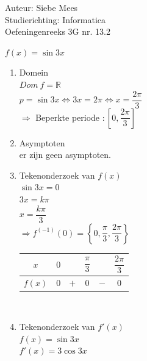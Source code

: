\documentclass[a4paper]{article}
\begin{document}
  
\noindent \large Auteur: Siebe Mees \\
\noindent \large Studierichting: Informatica\\
\noindent \large Oefeningenreeks 3G nr. 13.2\\

\medskip

\normalsize

$f(x)=\sin 3x$\\

\begin{enumerate}

\item Domein\\

$Dom\ f=\mathbb{R}$\\

$p = \sin 3x \Leftrightarrow 3x = 2\pi \Leftrightarrow x = \dfrac{2\pi}{3}$\\

$\Rightarrow $ Beperkte periode $:\left[0,\dfrac{2\pi}{3}\right]$\\


\item Asymptoten\\

er zijn geen asymptoten.\\


\item Tekenonderzoek van $f(x)$\\

$\sin 3x=0$\\

$3x=k\pi $\\

$x=\dfrac{k\pi}{3}$\\

$\Rightarrow f^{(-1)}(0)=\left\{0,\dfrac{\pi}{3},\dfrac{2\pi}{3}\right\}$\\

\begin{tabular}{c|ccccc}
$x$ & $0$ &  & $\dfrac{\pi}{3}$ &  & $\dfrac{2\pi}{3}$ \\ \hline
$f(x)$ & $0$ & $+$ & $0$ & $-$ & $0$
\end{tabular}\\


\item Tekenonderzoek van $f'(x)$\\

$f(x)=\sin 3x$\\

$f'(x)=3\cos 3x$\\


\end{enumerate}
\end{document}
